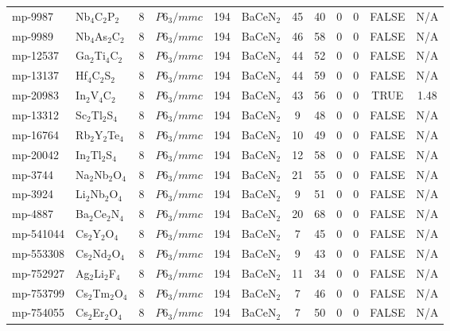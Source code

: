 {\begin{longtable}{llcccccccccc}
    mp-9987 & Nb$_{4}$C$_{2}$P$_{2}$ & 8     & $P6_3/mmc$ & 194   & BaCeN$_{2}$ & 45    & 40    & 0     & 0     & FALSE & N/A \\
    mp-9989 & Nb$_{4}$As$_{2}$C$_{2}$ & 8     & $P6_3/mmc$ & 194   & BaCeN$_{2}$ & 46    & 58    & 0     & 0     & FALSE & N/A \\
    mp-12537 & Ga$_{2}$Ti$_{4}$C$_{2}$ & 8     & $P6_3/mmc$ & 194   & BaCeN$_{2}$ & 44    & 52    & 0     & 0     & FALSE & N/A \\
    mp-13137 & Hf$_{4}$C$_{2}$S$_{2}$ & 8     & $P6_3/mmc$ & 194   & BaCeN$_{2}$ & 44    & 59    & 0     & 0     & FALSE & N/A \\
    mp-20983 & In$_{2}$V$_{4}$C$_{2}$ & 8     & $P6_3/mmc$ & 194   & BaCeN$_{2}$ & 43    & 56    & 0     & 0     & TRUE  & 1.48  \\
    mp-13312 & Sc$_{2}$Tl$_{2}$S$_{4}$ & 8     & $P6_3/mmc$ & 194   & BaCeN$_{2}$ & 9     & 48    & 0     & 0     & FALSE & N/A \\
    mp-16764 & Rb$_{2}$Y$_{2}$Te$_{4}$ & 8     & $P6_3/mmc$ & 194   & BaCeN$_{2}$ & 10    & 49    & 0     & 0     & FALSE & N/A \\
    mp-20042 & In$_{2}$Tl$_{2}$S$_{4}$ & 8     & $P6_3/mmc$ & 194   & BaCeN$_{2}$ & 12    & 58    & 0     & 0     & FALSE & N/A \\
    mp-3744 & Na$_{2}$Nb$_{2}$O$_{4}$ & 8     & $P6_3/mmc$ & 194   & BaCeN$_{2}$ & 21    & 55    & 0     & 0     & FALSE & N/A \\
    mp-3924 & Li$_{2}$Nb$_{2}$O$_{4}$ & 8     & $P6_3/mmc$ & 194   & BaCeN$_{2}$ & 9     & 51    & 0     & 0     & FALSE & N/A \\
    mp-4887 & Ba$_{2}$Ce$_{2}$N$_{4}$ & 8     & $P6_3/mmc$ & 194   & BaCeN$_{2}$ & 20    & 68    & 0     & 0     & FALSE & N/A \\
    mp-541044 & Cs$_{2}$Y$_{2}$O$_{4}$ & 8     & $P6_3/mmc$ & 194   & BaCeN$_{2}$ & 7     & 45    & 0     & 0     & FALSE & N/A \\
    mp-553308 & Cs$_{2}$Nd$_{2}$O$_{4}$ & 8     & $P6_3/mmc$ & 194   & BaCeN$_{2}$ & 9     & 43    & 0     & 0     & FALSE & N/A \\
    mp-752927 & Ag$_{2}$Li$_{2}$F$_{4}$ & 8     & $P6_3/mmc$ & 194   & BaCeN$_{2}$ & 11    & 34    & 0     & 0     & FALSE & N/A \\
    mp-753799 & Cs$_{2}$Tm$_{2}$O$_{4}$ & 8     & $P6_3/mmc$ & 194   & BaCeN$_{2}$ & 7     & 46    & 0     & 0     & FALSE & N/A \\
    mp-754055 & Cs$_{2}$Er$_{2}$O$_{4}$ & 8     & $P6_3/mmc$ & 194   & BaCeN$_{2}$ & 7     & 50    & 0     & 0     & FALSE & N/A \\

\end{longtable}}
